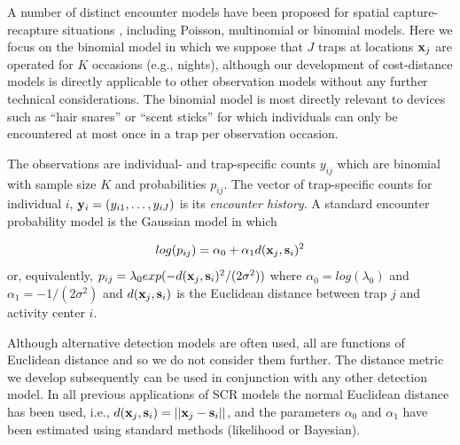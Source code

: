 \documentclass[12pt]{article}
\begin{document}
\begin{spacing}{1.8}

A number of distinct encounter %
models have been proposed for
spatial capture-recapture situations \citep{borchers_efford:2008,
  royle_etal:2009ecol, efford_etal:2009ecol}, including Poisson,
multinomial or binomial %
models.
Here we focus on the binomial model in which we
suppose that $J$ traps at locations ${\bf x}_{j}$ are operated for $K$
occasions (e.g., nights), although our development of cost-distance
models is directly applicable to other observation models without any
further technical considerations. The binomial model is most directly
relevant to devices such as ``hair snares''
\citep{woods_etal:1999,gardner_etal:2010jwm} or ``scent sticks''
\citep{kery_etal:2010} for which individuals can only be encountered
at most once in a trap per observation occasion.

The observations are individual- and trap-specific counts $y_{ij}$
which are binomial with sample size $K$ and probabilities
$p_{ij}$. The vector of trap-specific counts for individual $i$,
 ${\bf y}_{i} = (y_{i1},\ldots,y_{iJ})$ is its {\it encounter history}.
A standard encounter probability model
\citep{borchers_efford:2008} is the Gaussian model in which

\begin{equation}
log(p_{ij})= \alpha_{0} + \alpha_{1} d({\bf x}_{j}, {\bf s}_{i})^{2}
\label{eq.encounter}
\end{equation}
or, equivalently,
$p_{ij} = \lambda_{0} exp(-  d({\bf x}_{j}, {\bf s}_{i})^{2}
/(2\sigma^{2}) )$
where $\alpha_{0} = log(\lambda_{0})$ and $\alpha_{1} =
-1/(2\sigma^2)$ and $d({\bf x}_{j}, {\bf s}_{i})$ is the Euclidean
distance between trap $j$ and activity center $i$.


Although alternative detection models are often used, all are
functions of Euclidean distance and so we do not consider them
further. The distance metric we develop subsequently can be
used in conjunction with any other detection model.  In all previous
applications of SCR models the normal Euclidean distance has been
used, i.e., $ d({\bf x}_{j}, {\bf s}_{i}) = ||{\bf x}_{j} - {\bf
  s}_{i}||$, and the parameters $\alpha_0$ and $\alpha_1$ have been
estimated using standard methods (likelihood or Bayesian).


\end{spacing}
\end{document}
